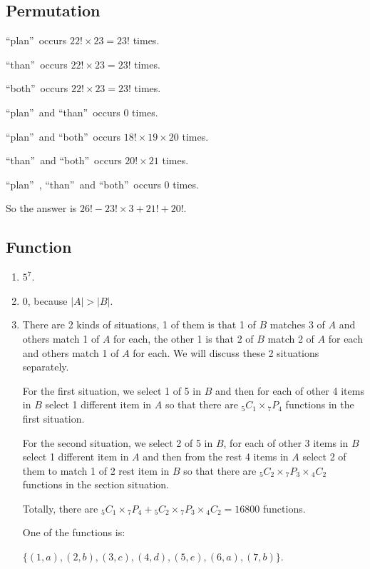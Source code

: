 \documentclass{sig-alternate-05-2015}
\begin{document}
\subsection{Permutation}
\textquotedblleft plan\textquotedblright\ occurs $22! \times 23 = 23!$ times.

\textquotedblleft than\textquotedblright\ occurs $22! \times 23 = 23!$ times.

\textquotedblleft both\textquotedblright\ occurs $22! \times 23 = 23!$ times.

\textquotedblleft plan\textquotedblright\ and \textquotedblleft than\textquotedblright\ occurs $0$ times.

\textquotedblleft plan\textquotedblright\ and \textquotedblleft both\textquotedblright\ occurs $18! \times 19 \times 20$ times.

\textquotedblleft than\textquotedblright\ and \textquotedblleft both\textquotedblright\ occurs $20! \times 21$ times.

\textquotedblleft plan\textquotedblright\ , \textquotedblleft than\textquotedblright\ and \textquotedblleft both\textquotedblright\ occurs $0$ times.

So the answer is $26! - 23! \times 3 + 21! + 20!$.

\newpage

\subsection{Function}
\begin{enumerate}
	\item $5^7$.
	\item $0$, because $|A| > |B|$.
	\item There are 2 kinds of situations, 1 of them is that 1 of $B$ matches 3 of $A$ and others match 1 of $A$ for each, the other 1 is that 2 of $B$ match 2 of $A$ for each and others match 1 of $A$ for each. We will discuss these 2 situations separately.
	
	For the first situation, we select 1 of 5 in $B$ and then for each of other 4 items in $B$ select 1 different item in $A$ so that there are ${}_5 C_1 \times {}_7 P_4$ functions in the first situation.
	
	For the second situation, we select 2 of 5 in $B$, for each of other 3 items in $B$ select 1 different item in $A$ and then from the rest 4 items in $A$ select 2 of them to match 1 of 2 rest item in $B$ so that there are ${}_5 C_2 \times {}_7 P_3 \times {}_4 C_2$ functions in the section situation.
	
	Totally, there are ${}_5 C_1 \times {}_7 P_4 + {}_5 C_2 \times {}_7 P_3 \times {}_4 C_2 = 16800$ functions.
	
	One of the functions is: 
	
	$\{(1, a), (2, b), (3, c), (4, d), (5, e), (6, a), (7, b)\}$.
\end{enumerate}
\end{document}
